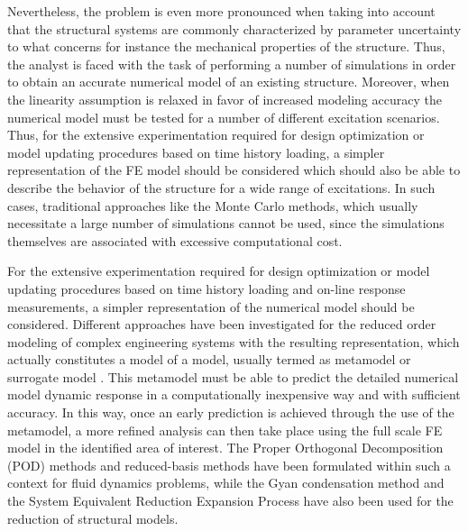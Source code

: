 \documentclass[preprint,3p,review,times,11pt]{elsarticle}
\begin{document}
Nevertheless, the problem is even more pronounced when taking into account that the structural systems are commonly characterized by parameter uncertainty to what concerns for instance the mechanical properties of the structure. Thus, the analyst is faced with the task of performing a number of simulations in order to obtain an accurate numerical model of an existing structure. Moreover, when the linearity assumption is relaxed in favor of increased modeling accuracy the numerical model must be tested for a number of different excitation scenarios. Thus, for the extensive experimentation required for design optimization or model updating procedures based on time history loading, a simpler representation of the FE model should be considered which should also be able to describe the behavior of the structure for a wide range of excitations.  In such cases, traditional approaches like the Monte Carlo methods, which usually necessitate a large number of simulations cannot be used, since the simulations themselves are associated with excessive computational cost. 

For the extensive experimentation required for design optimization or model updating procedures based on time history loading and on-line response measurements, a simpler representation of the numerical model should be considered. Different approaches have been investigated for the reduced order modeling of complex engineering systems with the resulting representation, which actually constitutes a model of a model, usually termed as metamodel or surrogate model \cite{Yesilyurta-Patera1995}. This metamodel must be able to predict the detailed numerical model dynamic response in a computationally inexpensive way and with sufficient accuracy. In this way, once an early prediction is achieved through the use of the metamodel, a more refined analysis can then take place using the full scale FE model in the identified area of interest. The Proper Orthogonal Decomposition (POD) methods \cite{Du-Gunzburger2002} and reduced-basis methods \cite{Peterson1989} have been formulated within such a context for fluid dynamics problems, while the Gyan condensation method and the System Equivalent Reduction Expansion Process \cite{Papadopoulos-Garcia1996} have also been used for the reduction of structural models. 
\end{document}
